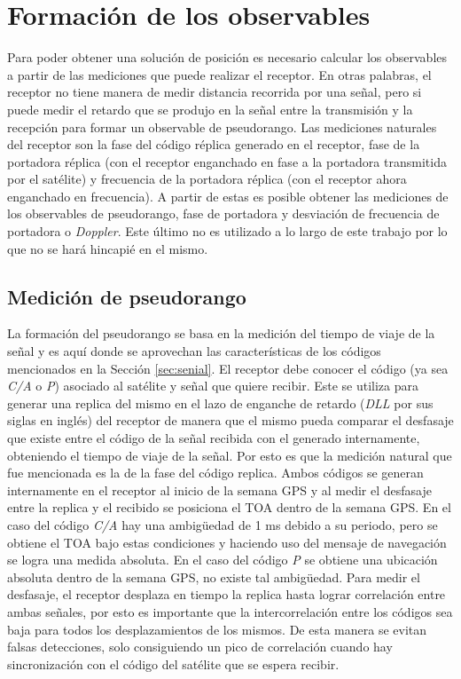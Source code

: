 \documentclass[a4paper,12pt,oneside,onecolumn,final,openright]{book}%
\begin{document}
\section{Formación de los observables}
	  Para poder obtener una solución de posición es necesario calcular los observables a partir de las mediciones que puede realizar el receptor. En otras palabras, el receptor no tiene manera de medir distancia recorrida por una señal, pero si puede medir el retardo que se produjo en la señal entre la transmisión y la recepción para formar un observable de pseudorango. Las mediciones naturales del receptor son la fase del código réplica generado en el receptor, fase de la portadora réplica (con el receptor enganchado en fase a la portadora transmitida por el satélite) y frecuencia de la portadora réplica (con el receptor ahora enganchado en frecuencia). A partir de estas es posible obtener las mediciones de los observables de pseudorango, fase de portadora y desviación de frecuencia de portadora o \textit{Doppler}. Este último no es utilizado a lo largo de este trabajo por lo que no se hará hincapié en el mismo.
	
\subsection{Medición de pseudorango}
	La formación del pseudorango se basa en la medición del tiempo de viaje de la señal y es aquí donde se aprovechan las características de los códigos mencionados en la Sección \ref{sec:senial}. El receptor debe conocer el código (ya sea \textit{C/A} o \textit{P}) asociado al satélite y señal que quiere recibir. Este se utiliza para generar una replica del mismo en el lazo de enganche de retardo (\textit{DLL} por sus siglas en inglés) del receptor de manera que el mismo pueda comparar el desfasaje que existe entre el código de la señal recibida con el generado internamente, obteniendo el tiempo de viaje de la señal. Por esto es que la medición natural que fue mencionada es la de la fase del código replica. Ambos códigos se generan internamente en el receptor al inicio de la semana GPS y al medir el desfasaje entre la replica y el recibido se posiciona el TOA dentro de la semana GPS. En el caso del código \textit{C/A} hay una ambigüedad de 1 ms debido a su periodo, pero se obtiene el TOA bajo estas condiciones y haciendo uso del mensaje de navegación se logra una medida absoluta. En el caso del código \textit{P} se obtiene una ubicación absoluta dentro de la semana GPS, no existe tal ambigüedad. Para medir el desfasaje, el receptor desplaza en tiempo la replica hasta lograr correlación entre ambas señales, por esto es importante que la intercorrelación entre los códigos sea baja para todos los desplazamientos de los mismos. De esta manera se evitan falsas detecciones, solo consiguiendo un pico de correlación cuando hay sincronización con el código del satélite que se espera recibir.
	
\end{document}
